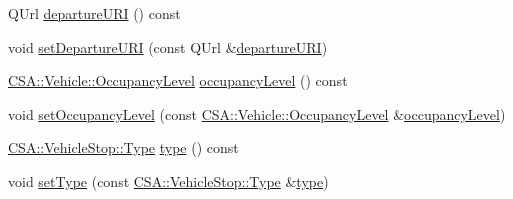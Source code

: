 \begin{DoxyCompactItemize}
\item 
Q\+Url \mbox{\hyperlink{classCSA_1_1VehicleStop_a936f754a9b2fd03fd6f4772947f20678}{departure\+U\+RI}} () const
\item 
void \mbox{\hyperlink{classCSA_1_1VehicleStop_afcf73c63b48ba26d8c8df85ca6056177}{set\+Departure\+U\+RI}} (const Q\+Url \&\mbox{\hyperlink{classCSA_1_1VehicleStop_a936f754a9b2fd03fd6f4772947f20678}{departure\+U\+RI}})
\item 
\mbox{\hyperlink{classCSA_1_1Vehicle_a331cc81107e5f0a8f37f894729dd9bda}{C\+S\+A\+::\+Vehicle\+::\+Occupancy\+Level}} \mbox{\hyperlink{classCSA_1_1VehicleStop_a2b1ae10dc6c7b77e5c28ebf646dab03c}{occupancy\+Level}} () const
\item 
void \mbox{\hyperlink{classCSA_1_1VehicleStop_ad23be128248c8d41b64dd60d66877204}{set\+Occupancy\+Level}} (const \mbox{\hyperlink{classCSA_1_1Vehicle_a331cc81107e5f0a8f37f894729dd9bda}{C\+S\+A\+::\+Vehicle\+::\+Occupancy\+Level}} \&\mbox{\hyperlink{classCSA_1_1VehicleStop_a2b1ae10dc6c7b77e5c28ebf646dab03c}{occupancy\+Level}})
\item 
\mbox{\hyperlink{classCSA_1_1VehicleStop_a7c2030d5a49808cb8e6fefaa691a76e0}{C\+S\+A\+::\+Vehicle\+Stop\+::\+Type}} \mbox{\hyperlink{classCSA_1_1VehicleStop_ae104457c93d6b341b140d730cead4bc6}{type}} () const
\item 
void \mbox{\hyperlink{classCSA_1_1VehicleStop_a90bc20355abad4463180a923b3bc3055}{set\+Type}} (const \mbox{\hyperlink{classCSA_1_1VehicleStop_a7c2030d5a49808cb8e6fefaa691a76e0}{C\+S\+A\+::\+Vehicle\+Stop\+::\+Type}} \&\mbox{\hyperlink{classCSA_1_1VehicleStop_ae104457c93d6b341b140d730cead4bc6}{type}})
\end{DoxyCompactItemize}
